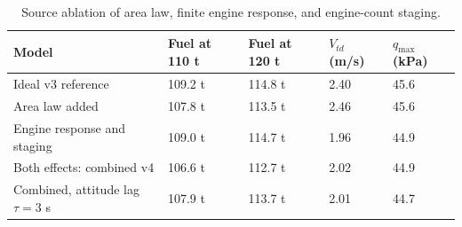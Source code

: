 \begin{table}[htbp]
\caption{Source ablation of area law, finite engine response, and engine-count staging.}
\label{tab:src18}
\small
\setlength{\tabcolsep}{3.5pt}
\begin{tabularx}{\linewidth}{@{}p{.36\linewidth}XXXX@{}}
\toprule
Model & Fuel at 110 t & Fuel at 120 t & $V_{td}$ (m/s) & $q_{\max}$ (kPa) \\
\midrule
Ideal v3 reference & 109.2 t & 114.8 t & 2.40 & 45.6 \\
Area law added & 107.8 t & 113.5 t & 2.46 & 45.6 \\
Engine response and staging & 109.0 t & 114.7 t & 1.96 & 44.9 \\
Both effects: combined v4 & 106.6 t & 112.7 t & 2.02 & 44.9 \\
Combined, attitude lag $\tau=3$ s & 107.9 t & 113.7 t & 2.01 & 44.7 \\
\bottomrule
\end{tabularx}
\end{table}
